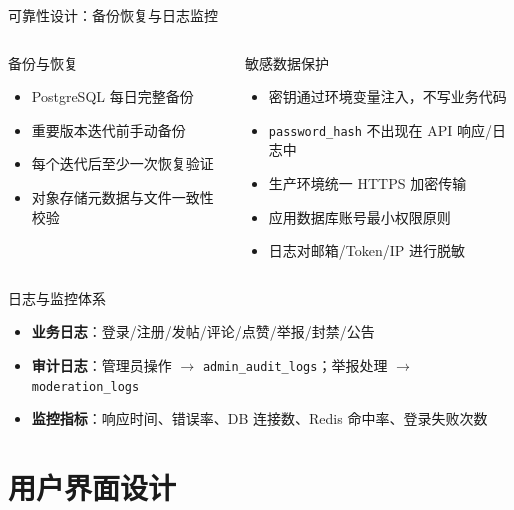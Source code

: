 \documentclass[aspectratio=169,UTF8]{ctexbeamer}
\begin{document}
\begin{frame}{可靠性设计：备份恢复与日志监控}
    \begin{columns}[T]
        \begin{block}{备份与恢复}
            \begin{itemize}
                \item PostgreSQL 每日完整备份
                \item 重要版本迭代前手动备份
                \item 每个迭代后至少一次恢复验证
                \item 对象存储元数据与文件一致性校验
            \end{itemize}
        \end{block}
        \begin{block}{敏感数据保护}
            \begin{itemize}
                \item 密钥通过环境变量注入，不写业务代码
                \item \texttt{password\_hash} 不出现在 API 响应/日志中
                \item 生产环境统一 HTTPS 加密传输
                \item 应用数据库账号最小权限原则
                \item 日志对邮箱/Token/IP 进行脱敏
            \end{itemize}
        \end{block}
    \end{columns}
    \vspace{0.2cm}
    \begin{block}{日志与监控体系}
        \begin{itemize}
            \item \textbf{业务日志}：登录/注册/发帖/评论/点赞/举报/封禁/公告
            \item \textbf{审计日志}：管理员操作 $\rightarrow$ \texttt{admin\_audit\_logs}；举报处理 $\rightarrow$ \texttt{moderation\_logs}
            \item \textbf{监控指标}：响应时间、错误率、DB 连接数、Redis 命中率、登录失败次数
        \end{itemize}
    \end{block}
\end{frame}

\section{用户界面设计}
\end{document}
